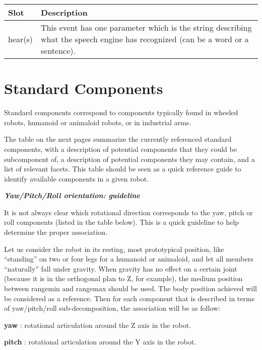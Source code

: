 \documentclass[a4paper]{article}
\begin{document}
\begin{flushleft}
\tablehead{}
\begin{supertabular}{|m{3.293cm}|m{11.997cm}|}
\hline
\sffamily\bfseries Slot &
\sffamily\bfseries Description\\\hline
hear(s) &
\sffamily This event has one parameter which is
the string describing what the speech engine has recognized (can be a
word or a sentence).\\\hline
\end{supertabular}
\end{flushleft}
\section[Standard Components]{Standard
Components}
{\sffamily
Standard components correspond to components typically found in wheeled
robots, humanoid or animaloid robots, or in industrial arms. }

{\sffamily
The table on the next pages summarize the currently referenced standard
components, with a description of potential components that they could
be subcomponent of, a description of potential components they may
contain, and a list of relevant facets. This table should be seen as a
quick reference guide to identify available components in a given
robot.}

{\sffamily\bfseries\itshape
Yaw/Pitch/Roll orientation: guideline}

{\sffamily
It is not always clear which rotational direction corresponds to the
yaw, pitch or roll components (listed in the table below). This is a
quick guideline to help determine the proper association. }

{\sffamily
Let us consider the robot in its resting, most prototypical position,
like “standing” on two or four legs for a humanoid or animaloid, and
let all members “naturally” fall under gravity. When gravity has no
effect on a certain joint (because it is in the orthogonal plan to Z,
for example), the medium position between rangemin and rangemax should
be used. The body position achieved will be considered as a reference.
Then for each component that is described in terms of yaw/pitch/roll
sub-decomposition, the association will be as follow:}

{
\textsf{\textbf{ yaw}}\textsf{ : rotational articulation around the Z
axis in the robot.}}

{\sffamily
\textbf{ pitch} : rotational articulation around the Y axis in the
robot.}
\end{document}
